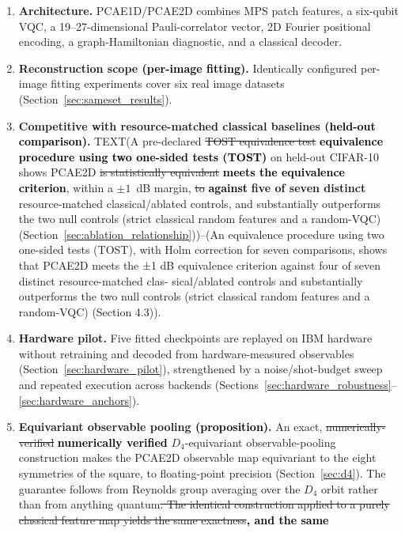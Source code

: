\documentclass[pdflatex,sn-basic]{sn-jnl}
\newcommand{\snew}[1]{\textbf{\textcolor{studentgreen}{#1}}}
\newcommand{\del}[1]{\sout{#1}}
\newcommand{\add}[1]{\textbf{\textcolor{black}{#1}}}
\begin{document}
\begin{enumerate}\itemsep3pt
  \item \textbf{Architecture.} PCAE1D/PCAE2D combines MPS patch features, a
        six-qubit VQC, a 19--27-dimensional Pauli-correlator vector, 2D Fourier
        positional encoding, a graph-Hamiltonian diagnostic, and a classical
        decoder.
  \item \textbf{Reconstruction scope \add{(per-image fitting)}.} Identically configured per-image fitting
        experiments cover six real image datasets
        (Section~\ref{sec:sameset_results}).
  \item \textbf{Competitive with resource-matched classical baselines \add{(held-out comparison)}.} TEXT(A
        pre-declared \del{TOST equivalence test} \add{equivalence procedure using
        two one-sided tests (TOST)} on held-out CIFAR-10 shows PCAE2D \del{is
        statistically equivalent} \add{meets the equivalence criterion}, within a $\pm1$~dB margin, \del{to} \add{against} \snew{five of seven
        distinct} resource-matched classical/ablated controls, and substantially
        outperforms the two null controls (strict classical random features and
        a random-VQC) (Section~\ref{sec:ablation_relationship}))--(An equivalence procedure using two one-sided tests (TOST),
with Holm correction for seven comparisons, shows that PCAE2D meets the
±1 dB equivalence criterion against four of seven distinct resource-matched clas-
sical/ablated controls and substantially outperforms the two null controls (strict
classical random features and a random-VQC) (Section 4.3)).
  \item \textbf{Hardware pilot.} Five fitted checkpoints are replayed on IBM
        hardware without retraining and decoded from hardware-measured
        observables (Section~\ref{sec:hardware_pilot}), strengthened by a
        noise/shot-budget sweep and repeated execution across backends
        (Sections~\ref{sec:hardware_robustness}--\ref{sec:hardware_anchors}).
  \item \textbf{Equivariant observable pooling \add{(proposition)}.} An exact,
        \del{numerically-verified} \add{numerically verified} $D_4$-equivariant observable-pooling construction
        makes the PCAE2D observable map equivariant to the eight symmetries of
        the square, to floating-point precision (Section~\ref{sec:d4}). The
        guarantee follows from Reynolds group averaging over the $D_4$ orbit
        rather than from anything quantum\del{. The identical construction applied to
        a purely classical feature map yields the same exactness}\add{, and the same
}
\end{enumerate}
\end{document}
